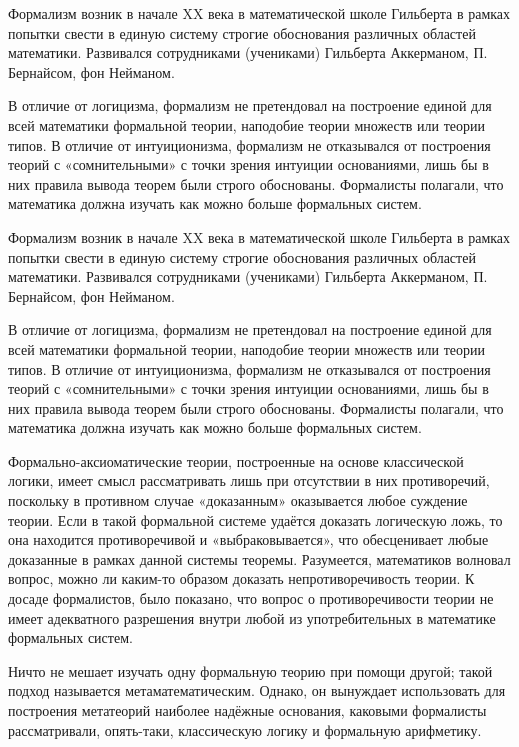 \documentclass[12pt, specialist, subf, substylefile = spbu.rtx]{disser}
\begin{document}
Формализм возник в начале XX века в математической школе Гильберта в рамках попытки свести в единую систему строгие обоснования различных областей математики. Развивался сотрудниками (учениками) Гильберта Аккерманом, П. Бернайсом, фон Нейманом.

В отличие от логицизма, формализм не претендовал на построение единой для всей математики формальной теории, наподобие теории множеств или теории типов. В отличие от интуиционизма, формализм не отказывался от построения теорий с «сомнительными» с точки зрения интуиции основаниями, лишь бы в них правила вывода теорем были строго обоснованы. Формалисты полагали, что математика должна изучать как можно больше формальных систем.

Формализм возник в начале XX века в математической школе Гильберта в рамках попытки свести в единую систему строгие обоснования различных областей математики. Развивался сотрудниками (учениками) Гильберта Аккерманом, П. Бернайсом, фон Нейманом.

В отличие от логицизма, формализм не претендовал на построение единой для всей математики формальной теории, наподобие теории множеств или теории типов. В отличие от интуиционизма, формализм не отказывался от построения теорий с «сомнительными» с точки зрения интуиции основаниями, лишь бы в них правила вывода теорем были строго обоснованы. Формалисты полагали, что математика должна изучать как можно больше формальных систем.

Формально-аксиоматические теории, построенные на основе классической логики, имеет смысл рассматривать лишь при отсутствии в них противоречий, поскольку в противном случае «доказанным» оказывается любое суждение теории. Если в такой формальной системе удаётся доказать логическую ложь, то она находится противоречивой и «выбраковывается», что обесценивает любые доказанные в рамках данной системы теоремы. Разумеется, математиков волновал вопрос, можно ли каким-то образом доказать непротиворечивость теории. К досаде формалистов, было показано, что вопрос о противоречивости теории не имеет адекватного разрешения внутри любой из употребительных в математике формальных систем.

Ничто не мешает изучать одну формальную теорию при помощи другой; такой подход называется метаматематическим. Однако, он вынуждает использовать для построения метатеорий наиболее надёжные основания, каковыми формалисты рассматривали, опять-таки, классическую логику и формальную арифметику.
\end{document}
